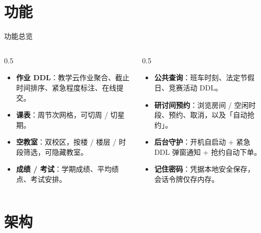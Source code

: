 \documentclass[aspectratio=169]{beamer}
\begin{document}
\section{功能}

\begin{frame}{功能总览}
  \begin{columns}[T]
    \begin{column}{0.5\textwidth}
      \begin{itemize}
        \item \textbf{作业 DDL}：教学云作业聚合、截止时间排序、紧急程度标注、在线提交。
        \item \textbf{课表}：周节次网格，可切周 / 切星期。
        \item \textbf{空教室}：双校区，按楼 / 楼层 / 时段筛选，可隐藏教室。
        \item \textbf{成绩 / 考试}：学期成绩、平均绩点、考试安排。
      \end{itemize}
    \end{column}
    \begin{column}{0.5\textwidth}
      \begin{itemize}
        \item \textbf{公共查询}：班车时刻、法定节假日、竞赛活动 DDL。
        \item \textbf{研讨间预约}：浏览房间 / 空闲时段、预约、取消，以及「自动抢约」。
        \item \textbf{后台守护}：开机自启动 + 紧急 DDL 弹窗通知 + 抢约自动下单。
        \item \textbf{记住密码}：凭据本地安全保存，会话令牌仅存内存。
      \end{itemize}
    \end{column}
  \end{columns}
\end{frame}

\section{架构}
\end{document}
